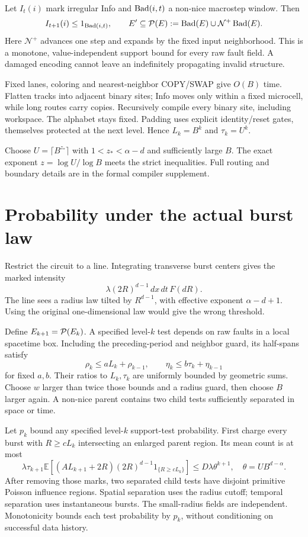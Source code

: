\documentclass[11pt,a4paper]{article}
\newcommand{\E}{\mathbb E}\newcommand{\Prb}{\mathbb P}
\begin{document}
Let $I_t(i)$ mark irregular Info and $\operatorname{Bad}(i,t)$ a non-nice macrostep window. Then
\[
 I_{t+1}(i)\le1_{\operatorname{Bad}(i,t)},\qquad
 E'\subseteq{\cal P}(E):=\operatorname{Bad}(E)\cup{\cal N}^{+}\operatorname{Bad}(E).
\]
Here $\mathcal N^{+}$ advances one step and expands by the fixed input neighborhood. This is a monotone, value-independent support bound for every raw fault field. A damaged encoding cannot leave an indefinitely propagating invalid structure.

Fixed lanes, coloring and nearest-neighbor COPY/SWAP give $O(B)$ time. Flatten tracks into adjacent binary sites; Info moves only within a fixed microcell, while long routes carry copies. Recursively compile every binary site, including workspace. The alphabet stays fixed. Padding uses explicit identity/reset gates, themselves protected at the next level. Hence $L_k=B^k$ and $\tau_k=U^k$.

Choose $U=\lceil B^{z_*}\rceil$ with $1<z_*<\alpha-d$ and sufficiently large $B$. The exact exponent $z=\log U/\log B$ meets the strict inequalities. Full routing and boundary details are in the formal compiler supplement.
\section{Probability under the actual burst law}
Restrict the circuit to a line. Integrating transverse burst centers gives the marked intensity
\[
 \lambda(2R)^{d-1}\,dx\,dt\,F(dR).
\]
The line sees a radius law tilted by $R^{d-1}$, with effective exponent $\alpha-d+1$. Using the original one-dimensional law would give the wrong threshold.

Define $E_{k+1}={\cal P}(E_k)$. A specified level-$k$ test depends on raw faults in a local spacetime box. Including the preceding-period and neighbor guard, its half-spans satisfy
\[
 \rho_k\le aL_k+\rho_{k-1},\qquad
 \eta_k\le b\tau_k+\eta_{k-1}
\]
for fixed $a,b$. Their ratios to $L_k,\tau_k$ are uniformly bounded by geometric sums. Choose $w$ larger than twice those bounds and a radius guard, then choose $B$ larger again. A non-nice parent contains two child tests sufficiently separated in space or time.

Let $p_k$ bound any specified level-$k$ support-test probability. First charge every burst with $R\ge cL_k$ intersecting an enlarged parent region. Its mean count is at most
\[
 \lambda\tau_{k+1}
 \E[(A L_{k+1}+2R)(2R)^{d-1}1_{\{R\ge cL_k\}}]
 \le D\lambda\theta^{k+1},\quad \theta=UB^{d-\alpha}.
\]
After removing those marks, two separated child tests have disjoint primitive Poisson influence regions. Spatial separation uses the radius cutoff; temporal separation uses instantaneous bursts. The small-radius fields are independent. Monotonicity bounds each test probability by $p_k$, without conditioning on successful data history.
\end{document}
